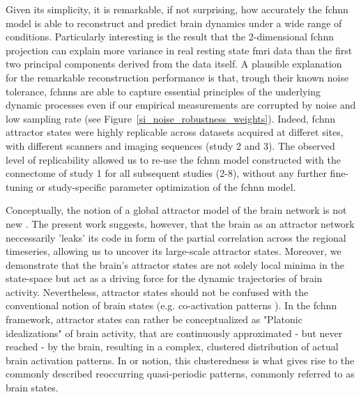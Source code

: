 \documentclass{article}
\begin{document}
Given its simplicity, it is remarkable, if not surprising, how accurately the \acrshort{fchnn} model is able to reconstruct and predict brain dynamics under a wide range of conditions. Particularly interesting is the result that the 2-dimensional \acrshort{fchnn} projection can explain more variance in real resting state \acrshort{fmri} data than the first two principal components derived from the data itself.
A plausible explanation for the remarkable reconstruction performance is that, trough their known noise tolerance, \acrshort{fchnn}s are able to capture essential principles of the underlying dynamic processes even if our empirical measurements are corrupted by noise and low sampling rate (see Figure~\ref{si_noise_robustness_weights}).
Indeed, \acrshort{fchnn} attractor states were highly replicable across datasets acquired at differet sites, with different scanners and imaging sequences (study 2 and 3). The observed level of replicability allowed us to re-use the \acrshort{fchnn} model constructed with the connectome of study 1 for all subsequent studies (2-8), without any further fine-tuning or study-specific parameter optimization of the \acrshort{fchnn} model.

Conceptually, the notion of a global attractor model of the brain network is not new \citep{deco2012ongoing}. The present work suggests, however, that the brain as an attractor network neccessarily 'leaks' its code in form of the partial correlation across the regional timeseries, allowing us to uncover its large-scale attractor states. Moreover, we demonstrate that the brain's attractor states are not solely local minima in the state-space but act as a driving force for the dynamic trajectories of brain activity. Nevertheless, attractor states should not be confused with the conventional notion of brain states (e.g. co-activation patterns \citep{chen2015introducing}). In the \acrshort{fchnn} framework, attractor states can rather be conceptualized as "Platonic idealizations" of brain activity, that are continuously approximated - but never reached - by the brain, resulting in a complex, clustered distribution of actual brain activation patterns. In or notion, this clusteredness is what gives rise to the commonly described reoccurring quasi-periodic patterns, commonly referred to as brain states.
\end{document}
